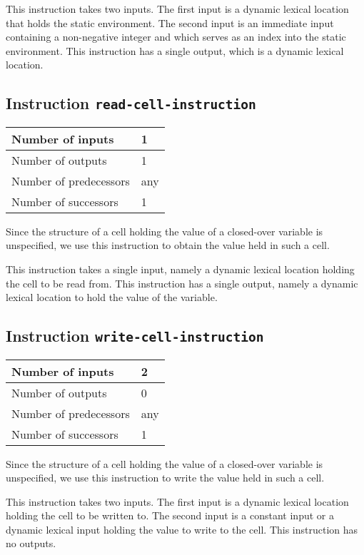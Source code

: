 This instruction takes two inputs.  The first input is a dynamic
lexical location that holds the static environment.  The second input
is an immediate input containing a non-negative integer and which
serves as an index into the static environment.  This instruction has
a single output, which is a dynamic lexical location.

\subsection{Instruction \texttt{read-cell-instruction}}
\label{mir-instruction-read-cell}

\begin{tabular}{|l|l|}
\hline
Number of inputs & 1\\
\hline
Number of outputs & 1\\
\hline
Number of predecessors & any\\
\hline
Number of successors & 1\\
\hline
\end{tabular}

Since the structure of a cell holding the value of a closed-over
variable is unspecified, we use this instruction to obtain the value
held in such a cell.

This instruction takes a single input, namely a dynamic lexical
location holding the cell to be read from.  This instruction has a
single output, namely a dynamic lexical location to hold the value of
the variable.

\subsection{Instruction \texttt{write-cell-instruction}}
\label{mir-instruction-write-cell}

\begin{tabular}{|l|l|}
\hline
Number of inputs & 2\\
\hline
Number of outputs & 0\\
\hline
Number of predecessors & any\\
\hline
Number of successors & 1\\
\hline
\end{tabular}

Since the structure of a cell holding the value of a closed-over
variable is unspecified, we use this instruction to write the value
held in such a cell.

This instruction takes two inputs. The first input is a dynamic
lexical location holding the cell to be written to.  The second input
is a constant input or a dynamic lexical input holding the value to
write to the cell.  This instruction has no outputs.

